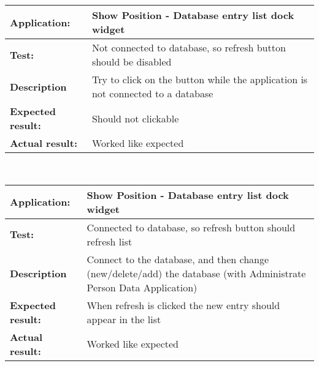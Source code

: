    \begin{tabular}{|p{3.5cm}|p{10.5cm}|}
    \hline
     \textbf{Application:}	& Show Position - Database entry list dock widget\\
    \hline
     \textbf{Test:}		& Not connected to database, so refresh button should be disabled\\
    \hline
     \textbf{Description}	& Try to click on the button while the application is not connected to a database\\
    \hline
     \textbf{Expected result:}	& Should not clickable\\
    \hline
     \textbf{Actual result:}	& Worked like expected\\
    \hline
   \end{tabular}\\
   \begin{tabular}{|p{3.5cm}|p{10.5cm}|}
    \hline
     \textbf{Application:}	& Show Position - Database entry list dock widget\\
    \hline
     \textbf{Test:}		& Connected to database, so refresh button should refresh list\\
    \hline
     \textbf{Description}	& Connect to the database, and then change (new/delete/add) the database (with Administrate Person Data Application)\\
    \hline
     \textbf{Expected result:}	& When refresh is clicked the new entry should appear in the list\\
    \hline
     \textbf{Actual result:}	& Worked like expected\\
    \hline
   \end{tabular}

